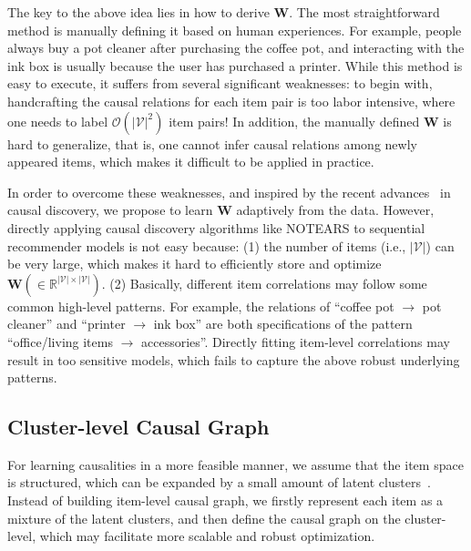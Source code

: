 \documentclass[conference]{IEEEtran}
\theoremstyle{definition}
\theoremstyle{theorem}
\theoremstyle{proof}
\theoremstyle{remark}
\begin{document}
The key to the above idea lies in how to derive $\bm{W}$.
The most straightforward method is manually defining it based on human experiences.
For example, people always buy a pot cleaner after purchasing the coffee pot, and interacting with the ink box is usually because the user has purchased a printer.
While this method is easy to execute, it suffers from several significant weaknesses:
to begin with, handcrafting the causal relations for each item pair is too labor intensive, where one needs to label $\mathcal{O}(|\mathcal{V}|^2)$ item pairs!
In addition, the manually defined $\bm{W}$ is hard to generalize, that is, one cannot infer causal relations among newly appeared items, which makes it difficult to be applied in practice.

In order to overcome these weaknesses, and inspired by the recent advances~\cite{zheng2018dags,brouillard2020differentiable,ng2019graph} in causal discovery, we propose to learn $\bm{W}$ adaptively from the data.
However, directly applying causal discovery algorithms like NOTEARS to sequential recommender models is not easy because:
(1) the number of items (i.e., $|\mathcal{V}|$) can be very large, which makes it hard to efficiently store and optimize $\bm{W} (\in \mathbb{R}^{|\mathcal{V}|\times |\mathcal{V}|})$.
(2) Basically, different item correlations may follow some common high-level patterns. For example, the relations of ``coffee pot $\rightarrow$ pot cleaner'' and ``printer $\rightarrow$ ink box'' are both specifications of the pattern ``office/living items $\rightarrow$ accessories''. 
Directly fitting item-level correlations may result in too sensitive models, which fails to capture the above robust underlying patterns.


\vspace{-0.cm}
\subsection{Cluster-level Causal Graph}
For learning causalities in a more feasible manner, we assume that the item space is structured, which can be expanded by a small amount of latent clusters~\cite{lee2013local,haeffele2014structured}.
Instead of building item-level causal graph, we firstly represent each item as a mixture of the latent clusters, and then define the causal graph on the cluster-level, which may facilitate more scalable and robust optimization.
\end{document}
